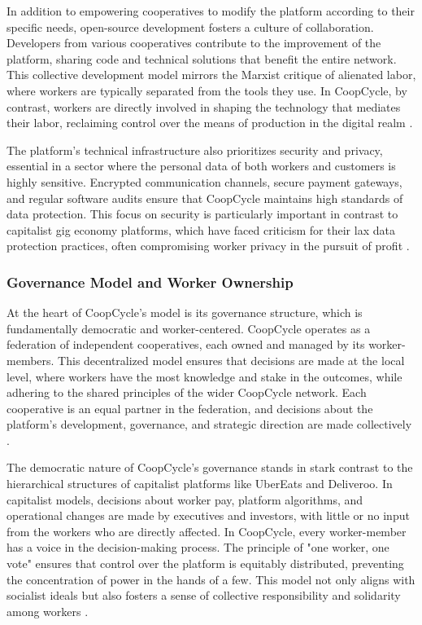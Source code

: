 \begin{refsection}
In addition to empowering cooperatives to modify the platform according to their specific needs, open-source development fosters a culture of collaboration. Developers from various cooperatives contribute to the improvement of the platform, sharing code and technical solutions that benefit the entire network. This collective development model mirrors the Marxist critique of alienated labor, where workers are typically separated from the tools they use. In CoopCycle, by contrast, workers are directly involved in shaping the technology that mediates their labor, reclaiming control over the means of production in the digital realm \cite[pp.~120-136]{marx2018}.

The platform’s technical infrastructure also prioritizes security and privacy, essential in a sector where the personal data of both workers and customers is highly sensitive. Encrypted communication channels, secure payment gateways, and regular software audits ensure that CoopCycle maintains high standards of data protection. This focus on security is particularly important in contrast to capitalist gig economy platforms, which have faced criticism for their lax data protection practices, often compromising worker privacy in the pursuit of profit \cite[pp.~89-105]{mason2015}.

\subsubsection{Governance Model and Worker Ownership}

At the heart of CoopCycle’s model is its governance structure, which is fundamentally democratic and worker-centered. CoopCycle operates as a federation of independent cooperatives, each owned and managed by its worker-members. This decentralized model ensures that decisions are made at the local level, where workers have the most knowledge and stake in the outcomes, while adhering to the shared principles of the wider CoopCycle network. Each cooperative is an equal partner in the federation, and decisions about the platform’s development, governance, and strategic direction are made collectively \cite[pp.~45-67]{smith2009}.

The democratic nature of CoopCycle’s governance stands in stark contrast to the hierarchical structures of capitalist platforms like UberEats and Deliveroo. In capitalist models, decisions about worker pay, platform algorithms, and operational changes are made by executives and investors, with little or no input from the workers who are directly affected. In CoopCycle, every worker-member has a voice in the decision-making process. The principle of "one worker, one vote" ensures that control over the platform is equitably distributed, preventing the concentration of power in the hands of a few. This model not only aligns with socialist ideals but also fosters a sense of collective responsibility and solidarity among workers \cite[pp.~104-118]{scholz2017}.


\end{refsection}
